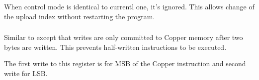 \begin{NextPort}
\end{NextPort}

When control mode is identical to currentl one, it's ignored. This allows change of the upload index without restarting the program.


\subsubsection{}

\begin{NextPort}
\end{NextPort}

Similar to  except that writes are only committed to Copper memory after two bytes are written. This prevents half-written instructions to be executed.

The first write to this register is for MSB of the Copper instruction and second write for LSB.


\pagebreak
\IntentionallyEmpty
\pagebreak
